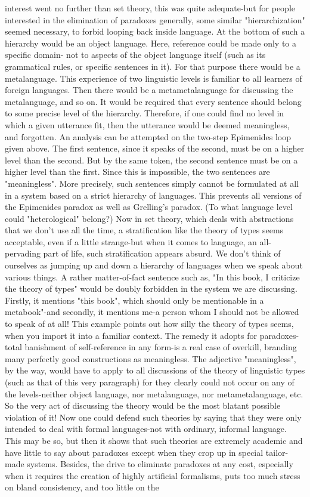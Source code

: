 interest went no further than set theory, this was quite adequate-but for people interested in the elimination of paradoxes generally, some similar "hierarchization" seemed necessary, to forbid looping back inside language. At the bottom of such a hierarchy would be an object language. Here, reference could be made only to a specific domain- not to aspects of the object language itself (such as its grammatical rules, or specific sentences in it). For that purpose there would be a metalanguage. This experience of two linguistic levels is familiar to all learners of foreign languages. Then there would be a metametalanguage for discussing the metalanguage, and so on. It would be required that every sentence should belong to some precise level of the hierarchy. Therefore, if one could find no level in which a given utterance fit, then the utterance would be deemed meaningless, and forgotten. An analysis can be attempted on the two-step Epimenides loop given above. The first sentence, since it speaks of the second, must be on a higher level than the second. But by the same token, the second sentence must be on a higher level than the first. Since this is impossible, the two sentences are "meaningless". More precisely, such sentences simply cannot be formulated at all in a system based on a strict hierarchy of languages. This prevents all versions of the Epimenides paradox as well as Grelling's paradox. (To what language level could "heterological" belong?) Now in set theory, which deals with abstractions that we don't use all the time, a stratification like the theory of types seems acceptable, even if a little strange-but when it comes to language, an all-pervading part of life, such stratification appears absurd. We don't think of ourselves as jumping up and down a hierarchy of languages when we speak about various things. A rather matter-of-fact sentence such as, "In this book, I criticize the theory of types" would be doubly forbidden in the system we are discussing. Firstly, it mentions "this book", which should only be mentionable in a metabook"-and secondly, it mentions me-a person whom I should not be allowed to speak of at all! This example points out how silly the theory of types seems, when you import it into a familiar context. The remedy it adopts for paradoxes-total banishment of self-reference in any form-is a real case of overkill, branding many perfectly good constructions as meaningless. The adjective "meaningless", by the way, would have to apply to all discussions of the theory of linguistic types (such as that of this very paragraph) for they clearly could not occur on any of the levels-neither object language, nor metalanguage, nor metametalanguage, etc. So the very act of discussing the theory would be the most blatant possible violation of it! Now one could defend such theories by saying that they were only intended to deal with formal languages-not with ordinary, informal language. This may be so, but then it shows that such theories are extremely academic and have little to say about paradoxes except when they crop up in special tailor-made systems. Besides, the drive to eliminate paradoxes at any cost, especially when it requires the creation of highly artificial formalisms, puts too much stress on bland consistency, and too little on the 
